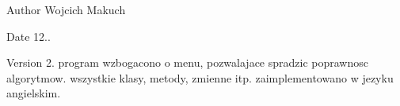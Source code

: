 \begin{DoxyAuthor}{Author}
Wojcich Makuch 
\end{DoxyAuthor}
\begin{DoxyDate}{Date}
12.. 
\end{DoxyDate}
\begin{DoxyVersion}{Version}
2. program wzbogacono o menu, pozwalajace spradzic poprawnosc algorytmow. wszystkie klasy, metody, zmienne itp. zaimplementowano w jezyku angielskim. 
\end{DoxyVersion}
